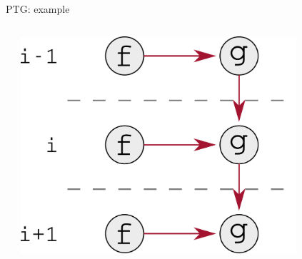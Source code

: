 \documentclass{beamer}
\begin{document}
\begin{frame}{PTG: example}

  \begin{columns}  

    \begin{column}{0.5\textwidth}
    \end{column}

    \begin{column}{0.5\textwidth}
      \includegraphics[width=0.8\textwidth]{figures/example_dag}%
    \end{column}

  \end{columns}
  
\end{frame}
\end{document}
